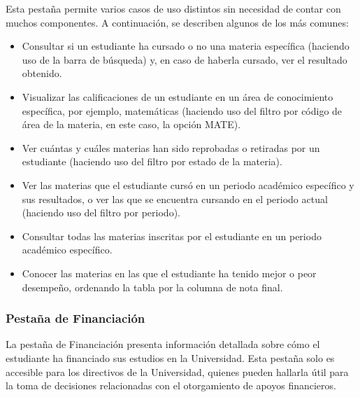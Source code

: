 Esta pestaña permite varios casos de uso distintos sin necesidad de contar con muchos componentes. A continuación, se describen algunos de los más comunes:
\begin{itemize}
	\item Consultar si un estudiante ha cursado o no una materia específica (haciendo uso de la barra de búsqueda) y, en caso de haberla cursado, ver el resultado obtenido.
	\item Visualizar las calificaciones de un estudiante en un área de conocimiento específica, por ejemplo, matemáticas (haciendo uso del filtro por código de área de la materia, en este caso, la opción MATE).
	\item Ver cuántas y cuáles materias han sido reprobadas o retiradas por un estudiante (haciendo uso del filtro por estado de la materia).
	\item Ver las materias que el estudiante cursó en un periodo académico específico y sus resultados, o ver las que se encuentra cursando en el periodo actual (haciendo uso del filtro por periodo).
	\item Consultar todas las materias inscritas por el estudiante en un periodo académico específico.
	\item Conocer las materias en las que el estudiante ha tenido mejor o peor desempeño, ordenando la tabla por la columna de nota final.
\end{itemize}

\subsubsection{Pestaña de Financiación}

La pestaña de Financiación presenta información detallada sobre cómo el estudiante ha financiado sus estudios en la Universidad. Esta pestaña solo es accesible para los directivos de la Universidad, quienes pueden hallarla útil para la toma de decisiones relacionadas con el otorgamiento de apoyos financieros.

